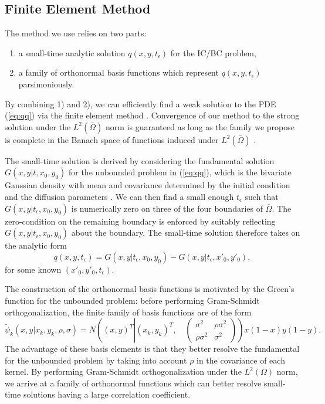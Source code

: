 \documentclass[10pt]{article}
\begin{document}
\subsection{Finite Element Method}
The method we use relies on two parts:
\begin{enumerate}
\item a small-time analytic solution $q(x,y,t_\epsilon)$ for the IC/BC problem,
\item a family of orthonormal basis functions which represent
  $q(x,y,t_\epsilon)$ parsimoniously.
\end{enumerate}
By combining 1) and 2), we can efficiently find a weak solution to the
PDE (\ref{eq:qq}) via the finite element method
\citep{shaidurov2013multigrid}. Convergence of our method to the
strong solution under the $L^2(\bar{\Omega})$ norm is guaranteed as
long as the family we propose is complete in the Banach space of
functions induced under $L^2(\bar{\Omega})$ \citep{salsa2016partial}.

The small-time solution is derived by considering the fundamental
solution $G(x,y |t, x_0, y_0)$ for the unbounded problem in
(\ref{eq:qq}), which is the bivariate Gaussian density with mean and
covariance determined by the initial condition and the diffusion
parameters \citep{stakgold2011green}. We can then find a small enough
$t_\epsilon$ such that $G(x,y|t_\epsilon,x_0, y_0)$ is numerically
zero on three of the four boundaries of $\bar{\Omega}$. The
zero-condition on the remaining boundary is enforced by suitably
reflecting $G(x,y|t_\epsilon,x_0, y_0)$ about the boundary. The
small-time solution therefore takes on the analytic form
\[
  q(x,y,t_\epsilon) = G(x,y|t_\epsilon,x_0, y_0) - G(x,y|t_\epsilon,x'_0, y'_0),
\]
for some known $(x'_0, y'_0, t_\epsilon)$.

The construction of the orthonormal basis functions is motivated by
the Green's function for the unbounded problem: before performing
Gram-Schmidt orthogonalization, the finite family of basis functions
are of the form
\[
  \tilde{\psi}_k(x,y| x_k, y_k, \rho, \sigma) = N\left( (x,y)^T \left|
      (x_k, y_k)^T , \quad \left( \begin{array}{cc}
                                     \sigma^2 & \rho \sigma^2 \\
                                     \rho \sigma^2 & \sigma^2
                     \end{array} \right) \right. \right) x(1-x)y(1-y).
\]
The advantage of these basis elements is that they better resolve the
fundamental for the unbounded problem by taking into account $\rho$ in
the covariance of each kernel. By performing Gram-Schmidt
orthogonalization under the $L^2(\Omega)$ norm, we arrive at a family
of orthonormal functions which can better resolve small-time solutions
having a large correlation coefficient.
\end{document}
